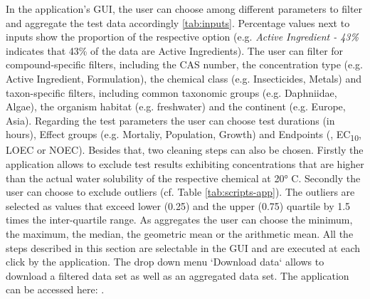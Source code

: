 In the application's GUI, the user can choose among different parameters to filter and aggregate the test data accordingly \ref{tab:inputs}. Percentage values next to inputs show the proportion of the respective option (e.g. \textit{Active Ingredient - 43\%} indicates that 43\% of the data are Active Ingredients). The user can filter for compound-specific filters, including the CAS number, the concentration type (e.g. Active Ingredient, Formulation), the chemical class (e.g. Insecticides, Metals) and taxon-specific filters, including common taxonomic groups (e.g. Daphniidae, Algae), the organism habitat (e.g. freshwater) and the continent (e.g. Europe, Asia). Regarding the test parameters the user can choose test durations (in hours), Effect groups (e.g. Mortaliy, Population, Growth) and Endpoints (\ecfifty, EC\textsubscript{10}, LOEC or NOEC). Besides that, two cleaning steps can also be chosen. Firstly the application allows to exclude test results exhibiting concentrations that are higher than the actual water solubility of the respective chemical at \ang{20} C. Secondly the user can choose to exclude outliers (cf. Table \ref{tab:scripts-app}). The outliers are selected as values that exceed lower (0.25) and the upper (0.75) quartile by 1.5 times the inter-quartile range. As aggregates the user can choose the minimum, the maximum, the median, the geometric mean or the arithmetic mean. All the steps described in this section are selectable in the GUI and are executed at each click by the application. The drop down menu `Download data` allows to download a filtered data set as well as an aggregated data set.
The \etoxbase{} application can be accessed here: \app{}.

